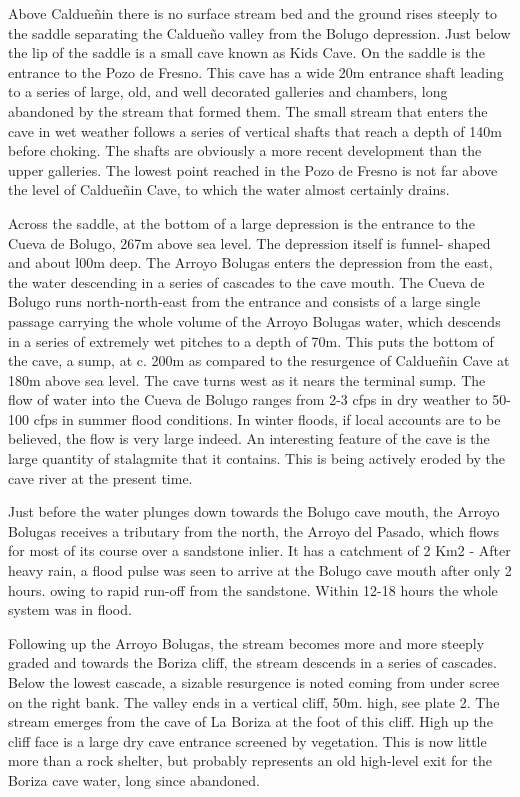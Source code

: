 \documentclass[11pt, a4paper, twoside]{memoir}
\begin{document}
Above Caldueñin there is no surface stream bed and the ground rises steeply to the saddle separating the Caldueño valley from the Bolugo depression. Just below the lip of the saddle is a small cave known as Kids Cave. On the saddle is the entrance to the Pozo de Fresno. This cave has a wide 20m entrance shaft leading to a series of large, old, and well decorated galleries and chambers, long abandoned by the stream that formed them. The small stream that enters the cave in wet weather follows a series of vertical shafts that reach a depth of 140m before choking. The shafts are obviously a more recent development than the upper galleries. The lowest point reached in the Pozo de Fresno is not far above the level of Caldueñin Cave, to which the water almost certainly drains.

Across the saddle, at the bottom of a large depression is the entrance to the Cueva de Bolugo, 267m above sea level. The depression itself is funnel- shaped and about l00m deep. The Arroyo Bolugas enters the depression from the east, the water descending in a series of cascades to the cave mouth. The Cueva de Bolugo runs north-north-east from the entrance and consists of a large single passage carrying the whole volume of the Arroyo Bolugas water, which descends in a series of extremely wet pitches to a depth of 70m. This puts the bottom of the cave, a sump, at c. 200m as compared to the resurgence of Caldueñin Cave at 180m above sea level. The cave turns west as it nears the terminal sump. The flow of water into the Cueva de Bolugo ranges from 2-3 cfps in dry weather to 50-100 cfps in summer flood conditions. In winter floods, if local accounts are to be believed, the flow is very large indeed. An interesting feature of the cave is the large quantity of stalagmite that it contains. This is being actively eroded by the cave river at the present time.

Just before the water plunges down towards the Bolugo cave mouth, the Arroyo Bolugas receives a tributary from the north, the Arroyo del Pasado, which flows for most of its course over a sandstone inlier. It has a catchment of 2 Km2 - After heavy rain, a flood pulse was seen to arrive at the Bolugo cave mouth after only 2 hours. owing to rapid run-off from the sandstone. Within 12-18 hours the whole system was in flood.

Following up the Arroyo Bolugas, the stream becomes more and more steeply graded and towards the Boriza cliff, the stream descends in a series of cascades. Below the lowest cascade, a sizable resurgence is noted coming from under scree on the right bank. The valley ends in a vertical cliff, 50m. high, see plate 2. The stream emerges from the cave of La Boriza at the foot of this cliff. High up the cliff face is a large dry cave entrance screened by vegetation. This is now little more than a rock shelter, but probably represents an old high-level exit for the Boriza cave water, long since abandoned.
\end{document}

